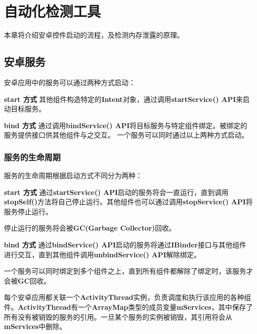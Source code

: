 
\chapter{自动化检测工具}\label{chapter_system}

本章将介绍安卓控件启动的流程，及检测内存泄露的原理。

\section{安卓服务}
安卓应用中的服务可以通过两种方式启动\cite{service}：

\textbf{start 方式 } 其他组件构造特定的\textbf{Intent}对象，通过调用\textbf{startService() API}来启动目标服务。

\textbf{bind 方式 } 通过调用\textbf{bindService() API}将目标服务与特定组件绑定。被绑定的服务提供接口供其他组件与之交互。
一个服务可以同时通过以上两种方式启动。

\subsection{服务的生命周期}
服务的生命周期根据启动方式不同分为两种\cite{service}：

\textbf{start 方式 } 通过\textbf{startService() API}启动的服务将会一直运行，直到调用\textbf{stopSelf()}方法将自己停止运行。其他组件也可以通过调用\textbf{stopService() API}将服务停止运行。

停止运行的服务将会被\textbf{GC(Garbage Collector)}回收。

\textbf{bind 方式 } 通过\textbf{bindService() API}启动的服务将通过\textbf{IBinder}接口与其他组件进行交互，直到其他组件调用\textbf{unbindService() API}解除绑定。

一个服务可以同时绑定到多个组件之上，直到所有组件都解除了绑定时，该服务才会被\textbf{GC}回收。

每个安卓应用都关联一个\textbf{ActivityThread}实例，负责调度和执行该应用的各种组件。\textbf{ActivityThread}有一个\textbf{ArrayMap}类型的成员变量\textbf{mServices}，其中保存了所有没有被销毁的服务的引用。一旦某个服务的实例被销毁，其引用将会从\textbf{mServices}中删除。

